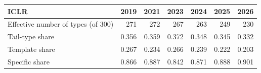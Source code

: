 \begin{tabular}{lrrrrrr}
\toprule
ICLR & 2019 & 2021 & 2023 & 2024 & 2025 & 2026 \\
\midrule
Effective number of types (of 300) & 271 & 272 & 267 & 263 & 249 & 230 \\
Tail-type share & 0.356 & 0.359 & 0.372 & 0.348 & 0.345 & 0.332 \\
Template share & 0.267 & 0.234 & 0.266 & 0.239 & 0.222 & 0.203 \\
Specific share & 0.866 & 0.887 & 0.842 & 0.871 & 0.888 & 0.901 \\
\bottomrule
\end{tabular}
